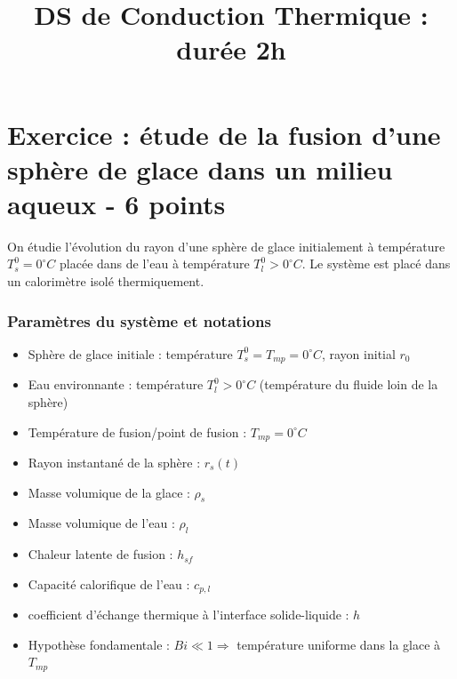 \documentclass[a4paper, 12pt]{article}
\begin{document}


\title{DS de Conduction Thermique : durée 2h}

\date{\vspace{-10ex}}
 
\maketitle


\vspace{1cm}

\section{Exercice : étude de la fusion d'une sphère de glace dans un milieu aqueux - 6 points}


On étudie l'évolution du rayon d'une sphère de glace initialement à température $T_s^0 = 0^\circ C$ placée dans de l'eau à température $T_{l}^0 > 0^\circ C$. Le système est placé dans un calorimètre isolé thermiquement.
\vspace{-0.5cm}
\subsubsection*{Paramètres du système et notations}
\begin{itemize}[itemsep=0pt, topsep=2pt, parsep=0pt, partopsep=0pt]
    \item Sphère de glace initiale : température $T_s^0 = T_{mp} = 0^\circ C$, rayon initial $r_0$
    \item Eau environnante : température $T_{l}^0 > 0^\circ C$ (température du fluide loin de la sphère)
    \item Température de fusion/point de fusion : $T_{mp} = 0^\circ C$
    \item Rayon instantané de la sphère : $r_s(t)$
    \item Masse volumique de la glace : $\rho_s$ 
    \item Masse volumique de l'eau : $\rho_l$ 
    \item Chaleur latente de fusion : $h_{sf}$ 
    \item Capacité calorifique de l'eau : $c_{p,l}$
    \item coefficient d'échange thermique à l'interface solide-liquide : $h$
    \item Hypothèse fondamentale : $Bi \ll 1 \Rightarrow$ température uniforme dans la glace à $T_{mp}$
\end{itemize}
\end{document}
